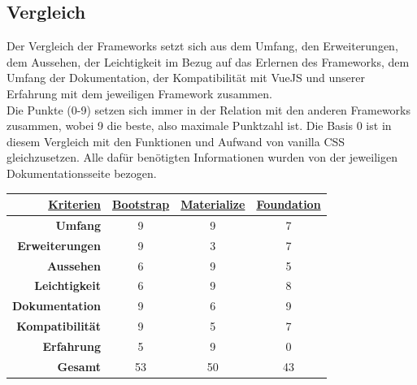 	\subsection{Vergleich}
	Der Vergleich der Frameworks setzt sich aus dem Umfang, den Erweiterungen, dem Aussehen, der Leichtigkeit im Bezug auf das Erlernen des Frameworks, dem Umfang der Dokumentation, der Kompatibilität mit VueJS und unserer Erfahrung mit dem jeweiligen Framework zusammen.\\
	Die Punkte (0-9) setzen sich immer in der Relation mit den anderen Frameworks zusammen, wobei 9 die beste, also maximale Punktzahl ist. Die Basis 0 ist in diesem Vergleich mit den Funktionen und Aufwand von vanilla CSS gleichzusetzen. Alle dafür benötigten Informationen wurden von der jeweiligen Dokumentationsseite bezogen.
	\begin{center}
		\begin{table}
			\centering
		\begin{tabular}{rccc}
			\hline
			\multicolumn{1}{|r|}{{\underline{\textbf{Kriterien}}}} & \multicolumn{1}{c|}{{\underline{\textbf{Bootstrap}}}} & \multicolumn{1}{c|}{{ \underline{\textbf{Materialize}}}} & \multicolumn{1}{c|}{{\underline{\textbf{Foundation}}}} \\ \hline
			\multicolumn{1}{|r|}{\textbf{Umfang}}          & \multicolumn{1}{c|}{9}                        & \multicolumn{1}{c|}{9}                          & \multicolumn{1}{c|}{7}                         \\ \hline
			\multicolumn{1}{|r|}{\textbf{Erweiterungen}}   & \multicolumn{1}{c|}{9}                        & \multicolumn{1}{c|}{3}                          & \multicolumn{1}{c|}{7}                         \\ \hline
			\multicolumn{1}{|r|}{\textbf{Aussehen}}        & \multicolumn{1}{c|}{6}                        & \multicolumn{1}{c|}{9}                          & \multicolumn{1}{c|}{5}                         \\ \hline
			\multicolumn{1}{|r|}{\textbf{Leichtigkeit}}    & \multicolumn{1}{c|}{6}                        & \multicolumn{1}{c|}{9}                          & \multicolumn{1}{c|}{8}                         \\ \hline
			\multicolumn{1}{|r|}{\textbf{Dokumentation}}   & \multicolumn{1}{c|}{9}                        & \multicolumn{1}{c|}{6}                          & \multicolumn{1}{c|}{9}                         \\ \hline
			\multicolumn{1}{|r|}{\textbf{Kompatibilität}}  & \multicolumn{1}{c|}{9}                        & \multicolumn{1}{c|}{5}                          & \multicolumn{1}{c|}{7}                         \\ \hline
			\multicolumn{1}{|r|}{\textbf{Erfahrung}}       & \multicolumn{1}{c|}{5}                        & \multicolumn{1}{c|}{9}                          & \multicolumn{1}{c|}{0}                         \\ \hline
			\textbf{Gesamt}                                & 53                                            & 50                                              & 43                                            
		\end{tabular}
	\end{table}
	\end{center}
